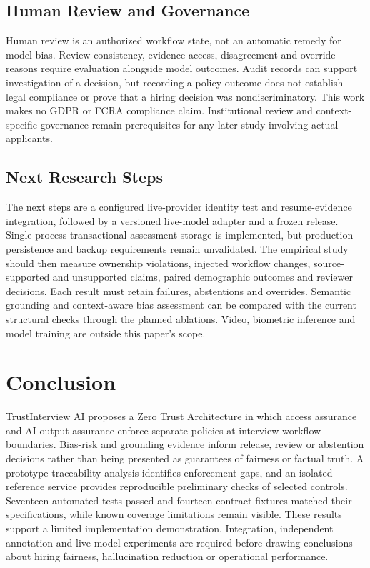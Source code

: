 \documentclass[conference]{IEEEtran}
\begin{document}
\subsection{Human Review and Governance}

Human review is an authorized workflow state, not an automatic remedy for model bias. Review consistency, evidence access, disagreement and override reasons require evaluation alongside model outcomes. Audit records can support investigation of a decision, but recording a policy outcome does not establish legal compliance or prove that a hiring decision was nondiscriminatory. This work makes no GDPR or FCRA compliance claim. Institutional review and context-specific governance remain prerequisites for any later study involving actual applicants.

\subsection{Next Research Steps}

The next steps are a configured live-provider identity test and resume-evidence integration, followed by a versioned live-model adapter and a frozen release. Single-process transactional assessment storage is implemented, but production persistence and backup requirements remain unvalidated. The empirical study should then measure ownership violations, injected workflow changes, source-supported and unsupported claims, paired demographic outcomes and reviewer decisions. Each result must retain failures, abstentions and overrides. Semantic grounding and context-aware bias assessment can be compared with the current structural checks through the planned ablations. Video, biometric inference and model training are outside this paper's scope.

\section{Conclusion}

TrustInterview AI proposes a Zero Trust Architecture in which access assurance and AI output assurance enforce separate policies at interview-workflow boundaries. Bias-risk and grounding evidence inform release, review or abstention decisions rather than being presented as guarantees of fairness or factual truth. A prototype traceability analysis identifies enforcement gaps, and an isolated reference service provides reproducible preliminary checks of selected controls. Seventeen automated tests passed and fourteen contract fixtures matched their specifications, while known coverage limitations remain visible. These results support a limited implementation demonstration. Integration, independent annotation and live-model experiments are required before drawing conclusions about hiring fairness, hallucination reduction or operational performance.
\end{document}
